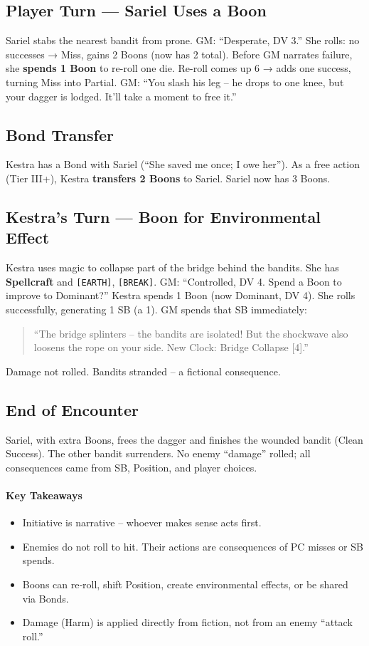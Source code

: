 \begin{tcolorbox}[colback=black!3!white,colframe=black!40!white,title={Encounter in Action: The Ambush at Raven’s Ford}]
\subsection*{Player Turn — Sariel Uses a Boon}
Sariel stabs the nearest bandit from prone. GM: “Desperate, DV 3.” She rolls: no successes → Miss, gains 2 Boons (now has 2 total). Before GM narrates failure, she \textbf{spends 1 Boon} to re-roll one die. Re-roll comes up 6 → adds one success, turning Miss into Partial. GM: “You slash his leg – he drops to one knee, but your dagger is lodged. It’ll take a moment to free it.”

\subsection*{Bond Transfer}
Kestra has a Bond with Sariel (“She saved me once; I owe her”). As a free action (Tier III+), Kestra \textbf{transfers 2 Boons} to Sariel. Sariel now has 3 Boons.

\subsection*{Kestra’s Turn — Boon for Environmental Effect}
Kestra uses magic to collapse part of the bridge behind the bandits. She has \textbf{Spellcraft} and \texttt{[EARTH]}, \texttt{[BREAK]}. GM: “Controlled, DV 4. Spend a Boon to improve to Dominant?” Kestra spends 1 Boon (now Dominant, DV 4). She rolls successfully, generating 1 SB (a 1). GM spends that SB immediately:
\begin{quote}
“The bridge splinters – the bandits are isolated! But the shockwave also loosens the rope on your side. New Clock: Bridge Collapse [4].”
\end{quote}
Damage not rolled. Bandits stranded – a fictional consequence.

\subsection*{End of Encounter}
Sariel, with extra Boons, frees the dagger and finishes the wounded bandit (Clean Success). The other bandit surrenders. No enemy “damage” rolled; all consequences came from SB, Position, and player choices.

\paragraph{Key Takeaways}
\begin{itemize}
\item Initiative is narrative – whoever makes sense acts first.
\item Enemies do not roll to hit. Their actions are consequences of PC misses or SB spends.
\item Boons can re‑roll, shift Position, create environmental effects, or be shared via Bonds.
\item Damage (Harm) is applied directly from fiction, not from an enemy “attack roll.”
\end{itemize}
\end{tcolorbox}

